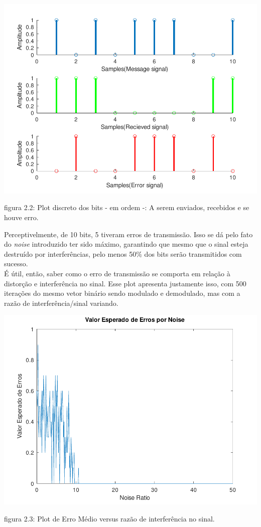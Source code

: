 \documentclass[11pt,a4paper]{report}
\begin{document}
\begin{center}
	\includegraphics[clip, trim=0.0cm 0cm 0.0cm 0.0cm, 								width=1.00\textwidth]{sinais_comp}
\end{center}
\begin{center}
	{\footnotesize figura 2.2: Plot discreto dos bits - em ordem -: A serem enviados, recebidos e se houve erro.}
\end{center}
	Perceptivelmente, de 10 bits, 5 tiveram erros de transmissão. Isso se dá pelo fato do {\it noise} introduzido ter sido máximo, garantindo que mesmo que o sinal esteja destruído por interferências, pelo menos 50\% dos bits serão transmitidos com sucesso.\\
		
	É útil, então, saber como o erro de transmissão se comporta em relação à distorção e interferência no sinal. Esse plot apresenta justamente isso, com 500 iterações do mesmo vetor binário sendo modulado e demodulado, mas com a razão de interferência/sinal variando. 
	\begin{center}

		\includegraphics[clip, trim=0.0cm 0cm 0.0cm 0.0cm, 								width=1.00\textwidth]{errorplot}
	\end{center}
\begin{center}
	{\footnotesize figura 2.3: Plot de Erro Médio versus razão de interferência no sinal.}
\end{center}
\end{document}
